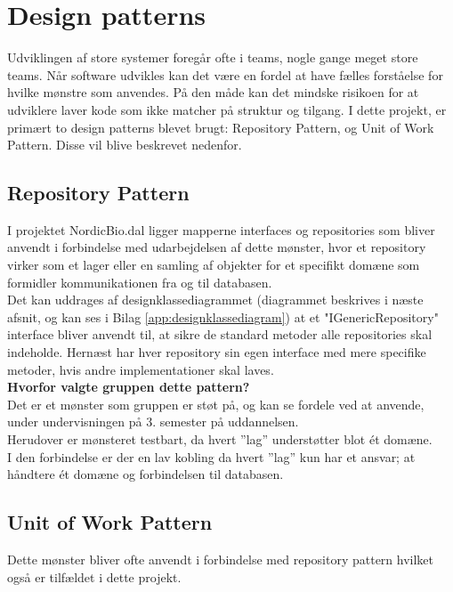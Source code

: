 \section{Design patterns}\label{designpatterns}
Udviklingen af store systemer foregår ofte i teams, nogle gange meget store teams. 
Når software udvikles kan det være en fordel at have fælles forståelse for hvilke mønstre som anvendes. 
På den måde kan det mindske risikoen for at udviklere laver kode som ikke matcher på struktur og tilgang. 
I dette projekt, er primært to design 
patterns blevet brugt: Repository Pattern, og Unit of Work Pattern. Disse vil blive beskrevet nedenfor.

\subsection{Repository Pattern}
I projektet NordicBio.dal ligger mapperne interfaces og repositories som bliver anvendt i forbindelse med udarbejdelsen af 
dette mønster, hvor et repository virker som et lager eller en samling af objekter for et specifikt domæne som formidler 
kommunikationen fra og til databasen. \\

Det kan uddrages af designklassediagrammet (diagrammet  beskrives i næste afsnit, 
og kan ses i Bilag \ref{app:designklassediagram}) at et 
"IGenericRepository" interface bliver anvendt til, 
at sikre de standard metoder alle repositories skal indeholde. 
Hernæst har hver repository sin egen interface med mere specifike metoder, hvis andre implementationer skal laves. \\

\textbf{Hvorfor valgte gruppen dette pattern?}\\
Det er et mønster som gruppen er støt på, og kan se fordele ved at anvende, under undervisningen på 3. semester på uddannelsen. \\

Herudover er mønsteret testbart, da hvert ”lag” understøtter blot ét domæne. \\

I den forbindelse er der en lav kobling da hvert ”lag” kun har et ansvar; at håndtere ét domæne og forbindelsen til databasen.

\subsection{Unit of Work Pattern}
Dette mønster bliver ofte anvendt i forbindelse med repository pattern hvilket også er tilfældet i dette projekt. \\

